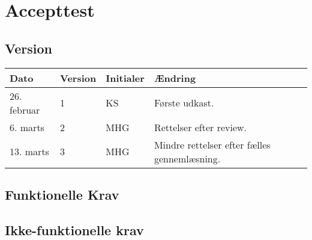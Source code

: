 \chapter{Accepttest} \label{ch:Accepttest}
\section{Version}
\begin{table}[h]
	\centering
	\begin{tabularx}{\textwidth - 2cm}{|l|l|l|X|}
	\hline
	Dato	& Version	& Initialer & Ændring	\\ \hline
	26. februar & 1 & KS & Første udkast. \\ \hline
	6. marts & 2 & MHG & Rettelser efter review. \\ \hline
	13. marts & 3 & MHG & Mindre rettelser efter fælles gennemlæsning.\\\hline
	\end{tabularx}
\end{table}
\section{Funktionelle Krav}
\clearpage
{} 
\clearpage
{}
\clearpage
{}
\clearpage
{}
\clearpage
{}

\section{Ikke-funktionelle krav}

\clearpage